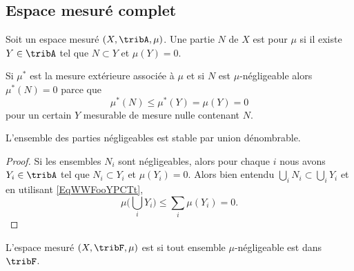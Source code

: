 \subsection{Espace mesuré complet}

\begin{definition}  \label{DefAVDoomkuXi}
    Soit un espace mesuré \( (X,\tribA,\mu)\). Une partie \( N\) de \( X\) est  pour \( \mu\) si il existe \( Y\in\tribA\) tel que \( N\subset Y\) et \( \mu(Y)=0\).
\end{definition}
Si \( \mu^*\) est la mesure extérieure associée à \( \mu\) et si \( N\) est \( \mu\)-négligeable alors \( \mu^*(N)=0\) parce que 
\begin{equation}
    \mu^*(N)\leq \mu^*(Y)=\mu(Y)=0
\end{equation}
pour un certain \( Y\) mesurable de mesure nulle contenant \( N\).

\begin{lemma}   \label{LemVKNooOCOQw}
    L'ensemble des parties négligeables est stable par union dénombrable.
\end{lemma}

\begin{proof}
    Si les ensembles \( N_i\) sont négligeables, alors pour chaque \( i\) nous avons \( Y_i\in\tribA\) tel que \( N_i\subset Y_i\) et \( \mu(Y_i)=0\). Alors bien entendu \( \bigcup_iN_i\subset \bigcup_iY_i\) et en utilisant \eqref{EqWWFooYPCTt},
    \begin{equation}
        \mu\big( \bigcup_iY_i \big)\leq \sum_i\mu(Y_i)=0.
    \end{equation}
\end{proof}

\begin{definition}  \label{DefBWAoomQZcI}
    L'espace mesuré \( (X,\tribF,\mu)\) est  si tout ensemble \( \mu\)-négligeable est dans \( \tribF\).
\end{definition}

